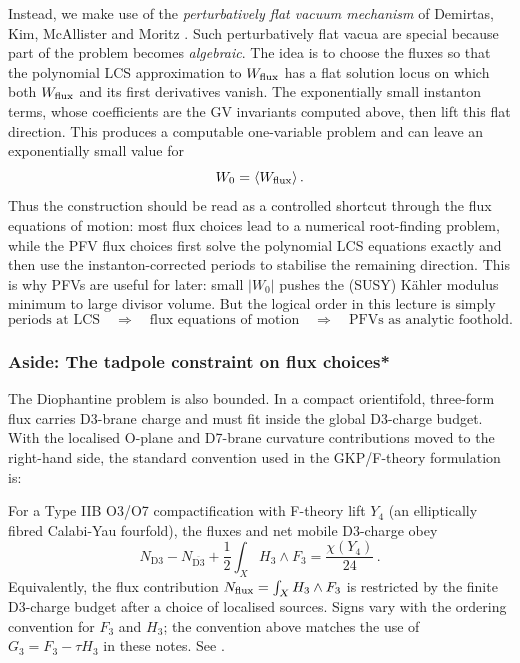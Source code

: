 Instead, we make use of the \emph{perturbatively flat
vacuum mechanism} of Demirtas, Kim, McAllister and Moritz
\cite{Demirtas:2019sip}. 
Such perturbatively flat vacua are special because part of the
problem becomes \emph{algebraic}.  The idea is to choose the fluxes so that
the polynomial LCS approximation to $W_{\rm flux}$ has a flat
solution locus on which both $W_{\rm flux}$ and its first derivatives
vanish.  The exponentially small instanton terms, whose coefficients
are the GV invariants computed above, then lift this flat direction.
This produces a computable one-variable problem and can leave an
exponentially small value for
\begin{equation}
    W_0=\langle W_{\rm flux}\rangle\, .
\end{equation}
Thus the construction should be read as a controlled
shortcut through the flux equations of motion: most flux choices lead
to a numerical root-finding problem, while the PFV flux choices first
solve the polynomial LCS equations exactly and then use the
instanton-corrected periods to stabilise the remaining direction.
This is why PFVs are useful for later:
small $|W_0|$ pushes the (SUSY) K\"ahler modulus minimum to large divisor
volume.  But the logical order in this lecture is simply
\begin{equation}
    \text{periods at LCS}
    \quad\Longrightarrow\quad
    \text{flux equations of motion}
    \quad\Longrightarrow\quad
    \text{PFVs as analytic foothold.}
\end{equation}


\subsubsection*{Aside: The tadpole constraint on flux choices*}

The Diophantine problem is also bounded.  In a compact
orientifold, three-form flux carries D3-brane charge and must fit
inside the global D3-charge budget.  With the localised O-plane and
D7-brane curvature contributions moved to the right-hand side, the
standard convention used in the GKP/F-theory formulation is:
\begin{proposition}\label{prop:tadpole}
For a Type IIB O3/O7 compactification with F-theory lift
$Y_4$ (an elliptically fibred Calabi-Yau fourfold), the fluxes and net mobile D3-charge obey
\begin{equation}\label{eq:tadpole}
    N_{\mathrm{D3}}-N_{\overline{\mathrm{D3}}}
    +\frac12\int_X H_3\wedge F_3
    =
    \frac{\chi(Y_4)}{24}\, .
\end{equation}
Equivalently, the flux contribution
$N_{\rm flux}=\int_X H_3\wedge F_3$ is restricted by the finite
D3-charge budget after a choice of localised sources.  Signs vary
with the ordering convention for $F_3$ and $H_3$; the convention above
matches the use of $G_3=F_3-\tau H_3$ in these notes.  See
\cite{Sethi:1996es,Giddings:2001yu}.
\end{proposition}

